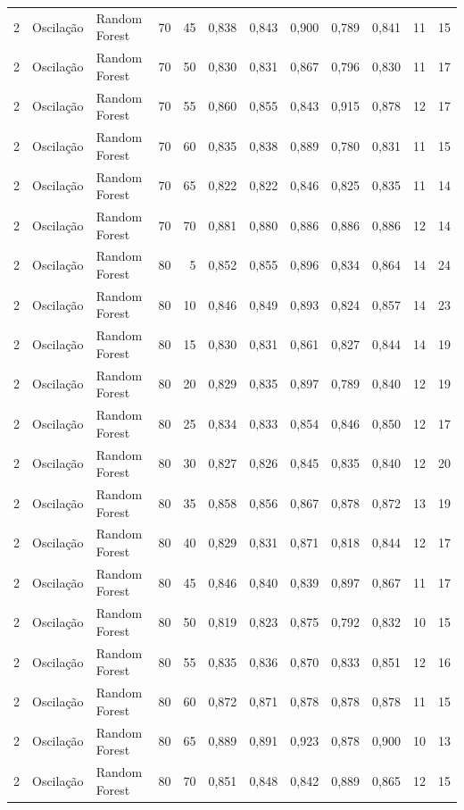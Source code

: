 \begin{longtable}{@{}rllrrrrrrrrr@{}}
2 & Oscilação & Random Forest & 70 & 45 & 0,838 & 0,843 & 0,900 & 0,789 & 0,841 & 11 & 15 \\
2 & Oscilação & Random Forest & 70 & 50 & 0,830 & 0,831 & 0,867 & 0,796 & 0,830 & 11 & 17 \\
2 & Oscilação & Random Forest & 70 & 55 & 0,860 & 0,855 & 0,843 & 0,915 & 0,878 & 12 & 17 \\
2 & Oscilação & Random Forest & 70 & 60 & 0,835 & 0,838 & 0,889 & 0,780 & 0,831 & 11 & 15 \\
2 & Oscilação & Random Forest & 70 & 65 & 0,822 & 0,822 & 0,846 & 0,825 & 0,835 & 11 & 14 \\
2 & Oscilação & Random Forest & 70 & 70 & 0,881 & 0,880 & 0,886 & 0,886 & 0,886 & 12 & 14 \\
2 & Oscilação & Random Forest & 80 & 5 & 0,852 & 0,855 & 0,896 & 0,834 & 0,864 & 14 & 24 \\
2 & Oscilação & Random Forest & 80 & 10 & 0,846 & 0,849 & 0,893 & 0,824 & 0,857 & 14 & 23 \\
2 & Oscilação & Random Forest & 80 & 15 & 0,830 & 0,831 & 0,861 & 0,827 & 0,844 & 14 & 19 \\
2 & Oscilação & Random Forest & 80 & 20 & 0,829 & 0,835 & 0,897 & 0,789 & 0,840 & 12 & 19 \\
2 & Oscilação & Random Forest & 80 & 25 & 0,834 & 0,833 & 0,854 & 0,846 & 0,850 & 12 & 17 \\
2 & Oscilação & Random Forest & 80 & 30 & 0,827 & 0,826 & 0,845 & 0,835 & 0,840 & 12 & 20 \\
2 & Oscilação & Random Forest & 80 & 35 & 0,858 & 0,856 & 0,867 & 0,878 & 0,872 & 13 & 19 \\
2 & Oscilação & Random Forest & 80 & 40 & 0,829 & 0,831 & 0,871 & 0,818 & 0,844 & 12 & 17 \\
2 & Oscilação & Random Forest & 80 & 45 & 0,846 & 0,840 & 0,839 & 0,897 & 0,867 & 11 & 17 \\
2 & Oscilação & Random Forest & 80 & 50 & 0,819 & 0,823 & 0,875 & 0,792 & 0,832 & 10 & 15 \\
2 & Oscilação & Random Forest & 80 & 55 & 0,835 & 0,836 & 0,870 & 0,833 & 0,851 & 12 & 16 \\
2 & Oscilação & Random Forest & 80 & 60 & 0,872 & 0,871 & 0,878 & 0,878 & 0,878 & 11 & 15 \\
2 & Oscilação & Random Forest & 80 & 65 & 0,889 & 0,891 & 0,923 & 0,878 & 0,900 & 10 & 13 \\
2 & Oscilação & Random Forest & 80 & 70 & 0,851 & 0,848 & 0,842 & 0,889 & 0,865 & 12 & 15 \\

\end{longtable}
